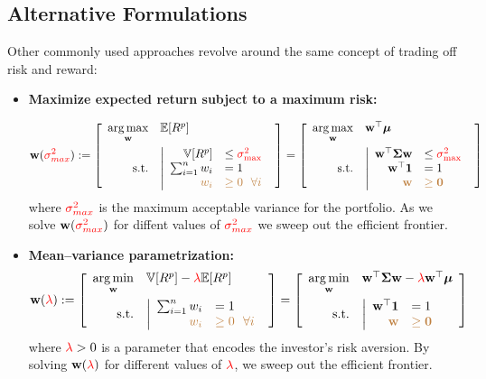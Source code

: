 \subsection{Alternative Formulations}
Other commonly used approaches revolve around the same concept of trading off risk and reward:
\begin{itemize}
    \item \textbf{Maximize expected return subject to a maximum risk:}

$$
\mbf w(\red{\sigma^2_{max}})
:=
\2{\begin{array}{rl}
\underset{\mbf w}{\arg \max} & \E [R^p]
\\[1em]
\t{s.t.} & 
	\left|
	\begin{array}{rl}
	\V[R^p] &\leq \red{\sigma_{\max}^2}
	\\
	\sum_{i=1}^n w_i &= 1
	\\
	\brown{w_i} &\brown{\geq 0 ~~\forall i}
	\end{array}
	\right.
\end{array}
}
=
\2{\begin{array}{rl}
\underset{\mbf w}{\arg \max} & \mbf w\'\b \mu 
\\ [1em]
\t{s.t.} & 
	\left|
	\begin{array}{rl}
	\mbf w\'\mbf \Sigma \mbf w &\leq \red{\sigma_{\max}^2}
	\\
	\mbf w\'\mbf 1 &= 1
	\\
	\brown{\mbf w} & \brown{\geq \mbf 0}
	\end{array}
	\right.
\end{array}
}
$$
where $\red{\sigma^2_{max}}$ is the maximum acceptable variance for the portfolio. As we solve $\mbf w(\red{\sigma^2_{max}})$ for diffent values of $\red{\sigma^2_{max}}$ we sweep out the efficient frontier.
    
    \item \textbf{Mean--variance parametrization:} 
$$
\mbf w(\red{\lambda}):=
\2{\begin{array}{rl}
\underset{\mbf w}{\arg \min} & \V[R^p] - \red{\lambda} \E [R^p]
\\ [1em]
\t{s.t.} & 
	\left|
	\begin{array}{rl}
	\sum_{i=1}^n w_i &= 1
	\\
	\brown{w_i} &\brown{\geq 0 ~~\forall i}
	\end{array}
	\right.
\end{array}
}
=
\2{\begin{array}{rl}
\underset{\mbf w}{\arg \min} & 
\mbf w\'\mbf \Sigma \mbf w - \red{\lambda} \mbf w\'\b \mu 
\\ [1em]
\t{s.t.} & 
	\left|
	\begin{array}{rl}
	\mbf w\'\mbf 1 &= 1
	\\
	\brown{\mbf w} & \brown{\geq \mbf 0}
	\end{array}
	\right.
\end{array}
}
$$
where $\red \lambda > 0$ is a parameter that encodes the investor's risk aversion. By solving $\mbf w(\red \lambda)$ for different values of $\red \lambda$, we sweep out the efficient frontier.
\end{itemize}

